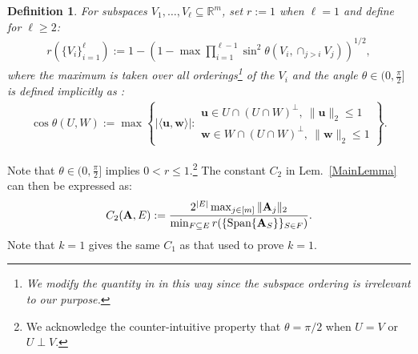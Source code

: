 \documentclass[9pt,twocolumn]{pnas-new}
\newtheorem{definition}{Definition}
\begin{document}
\begin{definition}\label{SpecialSupportSet}\label{FriedrichsDefinition}
For subspaces $V_1, \ldots, V_\ell \subseteq \mathbb{R}^m$, set $r := 1$ when $\ell = 1$ and define for $\ell \geq 2$:
\begin{align*}
r(\{V_i\}_{i=1}^\ell) := 1 - \left(1 -  \max \prod_{i=1}^{\ell-1} \sin^2  \theta \left(V_i, \cap_{j>i} V_j \right)  \right)^{1/2},
\end{align*} 
%
where the maximum is taken over all orderings\footnote{We modify the quantity in \cite{Deutsch12} in this way since the subspace ordering is irrelevant to our purpose.} of the $V_i$ and the angle $\theta \in (0,\frac{\pi}{2}]$ is defined implicitly as \cite[Def.~9.4]{Deutsch12}:
\begin{align*}
\cos{\theta(U,W)} := \max\left\{ |\langle \mathbf{u}, \mathbf{w} \rangle|: \substack{ \mathbf{u} \in U \cap (U \cap W)^\perp, \ \|\mathbf{u}\|_2 \leq 1 \\ \mathbf{w} \in W \cap (U \cap W)^\perp, \  \|\mathbf{w}\|_2 \leq 1 } \right\}.
\end{align*}
\end{definition}
Note that $\theta \in (0,\frac{\pi}{2}]$ implies $0 < r \leq 1$.\footnote{We acknowledge the counter-intuitive property that $\theta =  \pi/2$ when $U = V$ or $U \perp V$.}  %
The constant $C_2$ in Lem.~\ref{MainLemma} can then be expressed as:  %
\begin{align}\label{Cdef2}
C_2(\mathbf{A}, E) := \frac{ 2^{|E|} \max_{j \in [m]} \|\mathbf{A}_j\|_2}{ \min_{F \subseteq E} r( \{ \text{\rm Span}\{\mathbf{A}_{S}\} \}_{S \in F}) }.
\end{align}
Note that $k=1$ gives the same $C_1$ as that used to prove $k=1$.
\end{document}
